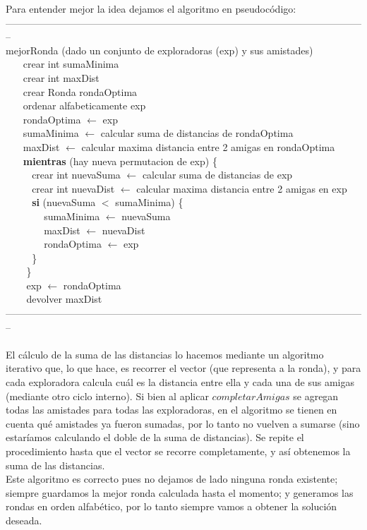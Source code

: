 Para entender mejor la idea dejamos el algoritmo en pseudocódigo:\\   
--------------------------------------------------------------------------------------------------------------\\
mejorRonda (dado un conjunto de exploradoras (exp) y sus amistades) \\
$~~~~~~~~$crear int sumaMinima \\
$~~~~~~~~$crear int maxDist \\
$~~~~~~~~$crear Ronda rondaOptima  \\
$~~~~~~~~$ordenar alfabeticamente exp \\
$~~~~~~~~$rondaOptima $\leftarrow$ exp \\
$~~~~~~~~$sumaMinima $\leftarrow$ calcular suma de distancias de rondaOptima  \\
$~~~~~~~~$maxDist $\leftarrow$ calcular maxima distancia entre 2 amigas en rondaOptima \\
$~~~~~~~~$\textbf{mientras} (hay nueva permutacion de exp) \{ \\
$~~~~~~~~~~~~$crear int nuevaSuma $\leftarrow$ calcular suma de distancias de exp  \\
$~~~~~~~~~~~~$crear int nuevaDist $\leftarrow$ calcular maxima distancia entre 2 amigas en exp  \\
$~~~~~~~~~~~~$\textbf{si} (nuevaSuma $<$ sumaMinima) \{ \\
$~~~~~~~~~~~~~~~~$ sumaMinima $\leftarrow$ nuevaSuma \\
$~~~~~~~~~~~~~~~~$ maxDist $\leftarrow$ nuevaDist \\
$~~~~~~~~~~~~~~~~$ rondaOptima $\leftarrow$ exp \\
$~~~~~~~~~~~~$\} \\
$~~~~~~~~$ \} \\
$~~~~~~~~$ exp $\leftarrow$ rondaOptima\\
$~~~~~~~~$ devolver maxDist\\
--------------------------------------------------------------------------------------------------------------\\ \\
El cálculo de la suma de las distancias lo hacemos mediante un algoritmo iterativo que, lo que hace, es recorrer el vector
(que representa a la ronda), y para cada exploradora calcula cuál es la distancia entre ella y cada una de sus amigas (mediante 
otro ciclo interno). Si bien al aplicar $completarAmigas$ se agregan todas las amistades para todas las exploradoras, en el algoritmo se 
tienen en cuenta qué amistades ya fueron sumadas, por lo tanto no vuelven a sumarse (sino estaríamos calculando el doble de la suma 
de distancias). Se repite el procedimiento hasta que el vector se recorre completamente, y así obtenemos la suma de las distancias.
\\
Este algoritmo es correcto pues no dejamos de lado ninguna ronda existente; siempre guardamos la mejor ronda calculada hasta el 
momento; y generamos las rondas en orden alfabético, por lo tanto siempre vamos a obtener la solución deseada.


